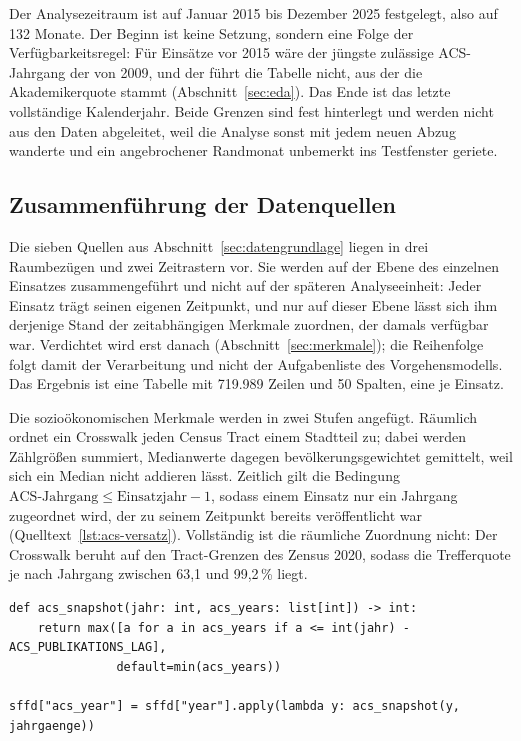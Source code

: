 Der Analysezeitraum ist auf Januar 2015 bis Dezember 2025 festgelegt, also auf
132 Monate. Der Beginn ist keine Setzung, sondern eine Folge der
Verfügbarkeitsregel: Für Einsätze vor 2015 wäre der jüngste zulässige
ACS-Jahrgang der von 2009, und der führt die Tabelle nicht, aus der die
Akademikerquote stammt (Abschnitt~\ref{sec:eda}). Das Ende ist das letzte
vollständige Kalenderjahr. Beide Grenzen sind fest hinterlegt und werden nicht
aus den Daten abgeleitet, weil die Analyse sonst mit jedem neuen Abzug wanderte
und ein angebrochener Randmonat unbemerkt ins Testfenster geriete.


\subsection{Zusammenführung der Datenquellen}
\label{sec:integration}

Die sieben Quellen aus Abschnitt~\ref{sec:datengrundlage} liegen in drei
Raumbezügen und zwei Zeitrastern vor. Sie werden auf der Ebene des einzelnen
Einsatzes zusammengeführt und nicht auf der späteren Analyseeinheit: Jeder
Einsatz trägt seinen eigenen Zeitpunkt, und nur auf dieser Ebene lässt sich ihm
derjenige Stand der zeitabhängigen Merkmale zuordnen, der damals verfügbar war.
Verdichtet wird erst danach (Abschnitt~\ref{sec:merkmale}); die Reihenfolge
folgt damit der Verarbeitung und nicht der Aufgabenliste des Vorgehensmodells.
Das Ergebnis ist eine Tabelle mit 719.989 Zeilen und 50 Spalten, eine je
Einsatz.

Die sozioökonomischen Merkmale werden in zwei Stufen angefügt. Räumlich ordnet
ein Crosswalk jeden Census Tract einem Stadtteil zu; dabei werden Zählgrößen
summiert, Medianwerte dagegen bevölkerungsgewichtet gemittelt, weil sich ein
Median nicht addieren lässt. Zeitlich gilt die Bedingung
$\text{ACS-Jahrgang} \le \text{Einsatzjahr} - 1$, sodass einem Einsatz nur ein
Jahrgang zugeordnet wird, der zu seinem Zeitpunkt bereits veröffentlicht war
(Quelltext~\ref{lst:acs-versatz}). Vollständig ist die räumliche Zuordnung
nicht: Der Crosswalk beruht auf den Tract-Grenzen des Zensus 2020, sodass die
Trefferquote je nach Jahrgang zwischen 63,1 und 99,2\,\% liegt.

\begin{lstlisting}[style=pythonstil,
  label={lst:acs-versatz},
  caption={Zeitbewusste Zuordnung des ACS-Jahrgangs
           (\texttt{prep/s1\_daten.py}, Z.~306--322 und 337, gekürzt)}]
def acs_snapshot(jahr: int, acs_years: list[int]) -> int:
    return max([a for a in acs_years if a <= int(jahr) - ACS_PUBLIKATIONS_LAG],
               default=min(acs_years))

sffd["acs_year"] = sffd["year"].apply(lambda y: acs_snapshot(y, jahrgaenge))
\end{lstlisting}

